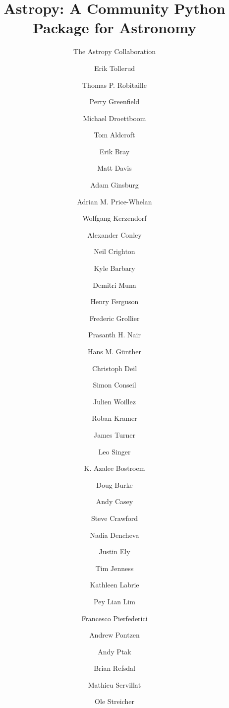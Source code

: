 \documentclass[traditabstract]{aa}
\begin{document}

\title{Astropy: A Community Python Package for Astronomy}




\author{
The Astropy Collaboration
  \and
Erik Tollerud\inst{\ref{inst:irvine}}  %
  \and
Thomas P. Robitaille\inst{\ref{inst:mpia}}  %
  \and
Perry Greenfield\inst{\ref{inst:stsci}}  %
  \and
Michael Droettboom\inst{\ref{inst:stsci}}  %
  \and
Tom Aldcroft\inst{\ref{inst:cfa}}  %
  \and
Erik Bray\inst{\ref{inst:stsci}}
  \and
Matt Davis\inst{\ref{inst:stsci}}  %
  \and
Adam Ginsburg\inst{\ref{inst:colorado}}  %
  \and
Adrian M. Price-Whelan\inst{\ref{inst:columbia}}  %
  \and
Wolfgang Kerzendorf\inst{\ref{inst:toronto}}
  \and
Alexander Conley\inst{\ref{inst:colorado}}
  \and
Neil Crighton\inst{\ref{inst:mpia}}  %
  \and
Kyle Barbary\inst{\ref{inst:argonne}}  %
  \and
Demitri Muna\inst{\ref{inst:nyu}}  %
  \and
Henry Ferguson\inst{\ref{inst:stsci}}
  \and
Frederic Grollier
  \and
Prasanth H. Nair\inst{\ref{inst:freelance}}  %
  \and
Hans M. G\"unther\inst{\ref{inst:cfa}}  %
  \and
Christoph Deil\inst{\ref{inst:mpik}}  %
  \and
Simon Conseil\inst{\ref{inst:oamp}}
  \and
Julien Woillez
  \and
Roban Kramer  %
  \and
James Turner\inst{\ref{inst:gemini_s}}  %
  \and
Leo Singer\inst{\ref{inst:ligo}}  %
  \and
K. Azalee Bostroem\inst{\ref{inst:stsci}}  %
  \and
Doug Burke\inst{\ref{inst:cfa}}  %
  \and
Andy Casey\inst{\ref{inst:stromlo}}  %
  \and
Steve Crawford\inst{\ref{inst:saao}}
  \and
Nadia Dencheva\inst{\ref{inst:stsci}}  %
  \and
Justin Ely\inst{\ref{inst:stsci}}  %
  \and
Tim Jenness\inst{\ref{inst:jac}}  %
  \and
Kathleen Labrie\inst{\ref{inst:gemini_n}}  %
  \and
Pey Lian Lim\inst{\ref{inst:stsci}}  %
  \and
Francesco Pierfederici\inst{\ref{inst:stsci}}  %
  \and
Andrew Pontzen\inst{\ref{inst:oxford}}  %
  \and
Andy Ptak\inst{\ref{inst:gsfc}}  %
  \and
Brian Refsdal  %
  \and
Mathieu Servillat\inst{\ref{inst:saclay}}  %
  \and
Ole Streicher\inst{\ref{inst:leibniz}}  %
}
\end{document}
